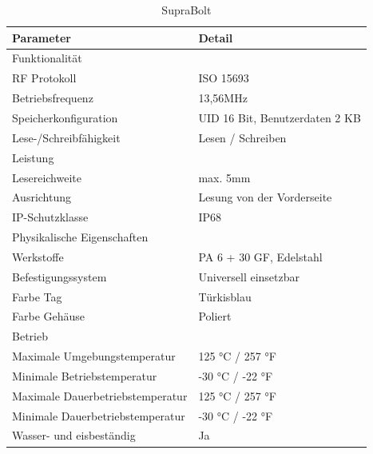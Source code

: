 \begin{table}[h!]
	\caption{SupraBolt} %
	\begin{center}
		\begin{tabular}{|l|l|}
			\hline
			\textbf{Parameter} &\textbf{Detail} \\
			\hline
			Funktionalität &  	\\
			\hline
			RF Protokoll & ISO 15693 	\\
			\hline
			Betriebsfrequenz & 13,56MHz 	\\	
			\hline
			Speicherkonfiguration  & UID 16 Bit, Benutzerdaten 2 KB 	\\	
			\hline
			Lese-/Schreibfähigkeit & Lesen / Schreiben  	\\	
			\hline
			Leistung &   	\\	
			\hline
			Lesereichweite & max. 5mm 	\\	
			\hline
			Ausrichtung  & Lesung von der Vorderseite \\	
			\hline
			IP-Schutzklasse & IP68 \\	
			\hline
			Physikalische Eigenschaften &   \\	
			\hline
			Werkstoffe & PA 6 + 30 GF, Edelstahl \\	
			\hline
			Befestigungssystem & Universell einsetzbar \\
			\hline
			Farbe Tag & Türkisblau 	\\	
			\hline
			Farbe Gehäuse & Poliert 	\\	
			\hline
			Betrieb &  	\\	
			\hline
			Maximale Umgebungstemperatur & 125 °C / 257 °F 	\\	
			\hline
			Minimale Betriebstemperatur & -30 °C / -22 °F	\\	
			\hline
			Maximale Dauerbetriebstemperatur  & 125 °C / 257 °F 	\\	
			\hline
			Minimale Dauerbetriebstemperatur & -30 °C / -22 °F	\\	
			\hline
			Wasser- und eisbeständig & Ja \\	
			\hline
			\end{tabular}
		\label{SupraBolt}
	\end{center}
\end{table} 

